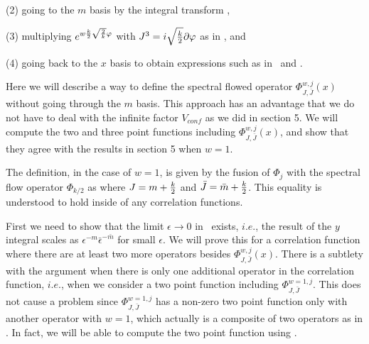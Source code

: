 (2) going to the $m$ basis by the integral transform \basis ,


(3) multiplying $e^{w{k\over 2} \sqrt{2\over k}
\varphi}$ with $J^3 = i \sqrt{k\over 2}\partial \varphi$
as in \spectflowact , and


(4) going back to the $x$ basis to obtain expressions such
as in \floweddis\ and \threepxus .

\noindent
Here we will describe a way to define the spectral flowed
operator $\Phi_{J,\bar J}^{w,j}(x)$ without going
through the $m$ basis. This approach has an advantage
that we do not have to deal with the infinite factor $V_{conf}$
as we did in section 5.
We will compute the two and
three point functions including $\Phi_{J,\bar J}^{w,j}(x)$,
and show that they agree with the results in section 5
when $w=1$.

The definition, in the case of $w=1$,
is given by the fusion of $\Phi_j$ with the spectral flow
operator $\Phi_{k/2}$ as
\eqn{}
where $J = m + {k\over 2}$ and $\bar J = \bar m + {k \over 2}$.
This equality is understood
to hold inside of any correlation functions.




First we need to show that the limit $\epsilon \rightarrow 0$
in \  exists, $i.e.$, the result of the $y$ integral
scales as $\epsilon^{-m}\bar{\epsilon}^{-\bar m}$ for
small $\epsilon$. We will prove this
for a correlation
function where there are
at least two more operators besides $\Phi_{J,\bar J}^{w,j}(x)$.
There is a subtlety with the argument when there is
only one additional operator in the correlation
function, $i.e.$, when we consider
a two point function including $\Phi^{w=1, j}_{J, \bar J}$.
This does not cause a problem since $\Phi^{w=1, j}_{J, \bar J}$
has a non-zero two point function only with another
operator with $w=1$, which actually is a composite of two
operators as in  . In fact, we will be able
to compute the two point function using  .

